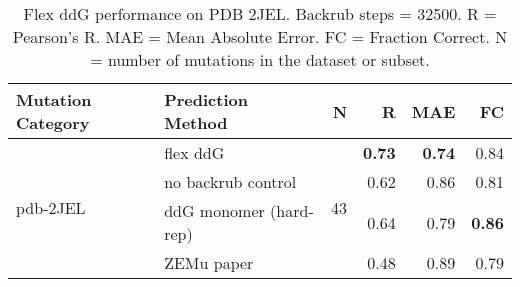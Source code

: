 \begin{table}
  \begin{tabular}{llrrrr}
\toprule
Mutation Category &       Prediction Method &   N &    R &  MAE &   FC \\
\midrule
 \multirow{ 4}{*}{pdb-2JEL} & flex ddG & \multirow{ 4}{*}{43} & \textbf{0.73} & \textbf{0.74} & 0.84  \\
 & no backrub control & & 0.62 & 0.86 & 0.81  \\
 & ddG monomer (hard-rep) & & 0.64 & 0.79 & \textbf{0.86}  \\
 & ZEMu paper & & 0.48 & 0.89 & 0.79  \\
\bottomrule
\end{tabular}
  \caption[Flex ddG performance on PDB 2JEL]{
    Flex ddG performance on PDB 2JEL. Backrub steps = 32500. R = Pearson's R. MAE = Mean Absolute Error. FC = Fraction Correct. N = number of mutations in the dataset or subset.
  } \label{tab:table-pdb-2JEL}
\end{table}
